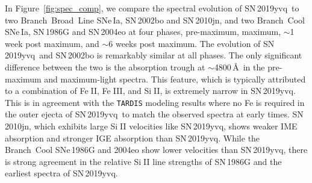 \documentclass[twocolumn]{aastex63}
\def\ion#1#2{#1$\;${\footnotesize\rm{#2}}\relax}
\newcommand{\sn}{SN\,2019yvq}
\begin{document}
In Figure~\ref{fig:spec_comp}, we compare the spectral evolution of \sn\ to
two Branch~Broad~Line SNe\,Ia, SN\,2002bo and SN\,2010jn, and two Branch~Cool
SNe\,Ia, SN\,1986G and SN\,2004eo \citep{Cristiani92,
Benetti04,Pastorello07,Silverman11,Hachinger13,Maguire14} at four phases,
pre-maximum, maximum, $\sim$1 week post maximum, and $\sim$6 weeks post
maximum. The evolution of \sn\ and SN\,2002bo is remarkably similar at all
phases. The only significant difference between the two is the absorption
trough at $\sim$4800\,\AA\ in the pre-maximum and maximum-light spectra. This
feature, which is typically attributed to a combination of \ion{Fe}{II},
\ion{Fe}{III}, and \ion{Si}{II}, is extremely narrow in \sn. This is in
agreement with the \texttt{TARDIS} modeling results where no Fe is required in
the outer ejecta of \sn\ to match the observed spectra at early times.
SN\,2010jn, which exhibits large \ion{Si}{II} velocities like \sn, shows
weaker IME absorption and stronger IGE absorption than \sn. While the
Branch~Cool SNe\,1986G and 2004eo show lower velocities than \sn, there is
strong agreement in the relative \ion{Si}{II} line strengths of SN\,1986G and
the earliest spectra of \sn.
\end{document}
